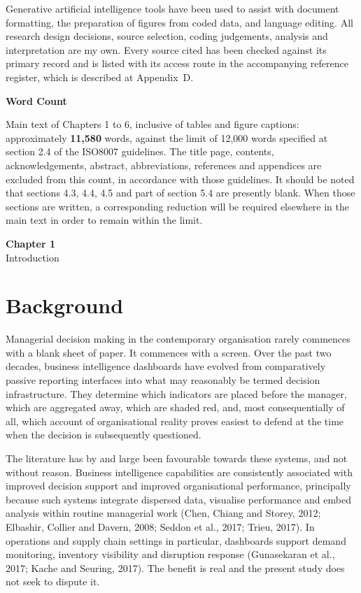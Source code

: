 \documentclass[12pt,a4paper]{article}
\newcounter{chapno}
\newcommand{\chapt}[2]{%
  \newpage
  \setcounter{chapno}{#1}%
  \setcounter{section}{0}\setcounter{subsection}{0}%
  \setcounter{figure}{0}\setcounter{table}{0}%
  \addtocontents{toc}{\protect\vspace{9pt}}%
  \addtocontents{toc}{\protect\noindent{\protect\bfseries Chapter #1:} #2\protect\par\protect\vspace{3pt}}%
  \begin{center}
    {\large\bfseries Chapter #1}\\[8pt]
    {\large #2}
  \end{center}
  \vspace{14pt}%
}
\begin{document}
Generative artificial intelligence tools have been used to assist with document formatting, the preparation
of figures from coded data, and language editing. All research design decisions, source selection, coding
judgements, analysis and interpretation are my own. Every source cited has been checked against its primary
record and is listed with its access route in the accompanying reference register, which is described at
Appendix~D.

\vspace{10pt}
\begin{center}{\large\bfseries Word Count}\end{center}
\vspace{10pt}

Main text of Chapters 1 to 6, inclusive of tables and figure captions: approximately \textbf{11,580}
words, against the limit of 12,000 words specified at section 2.4 of the ISO8007 guidelines. The title
page, contents, acknowledgements, abstract, abbreviations, references and appendices are excluded from this
count, in accordance with those guidelines. It should be noted that sections 4.3, 4.4, 4.5 and part of
section 5.4 are presently blank. When those sections are written, a corresponding reduction will be
required elsewhere in the main text in order to remain within the limit.

\newpage
{}
\setcounter{page}{1}

\chapt{1}{Introduction}

\section{Background}

Managerial decision making in the contemporary organisation rarely commences with a blank sheet of paper.
It commences with a screen. Over the past two decades, business intelligence dashboards have evolved from
comparatively passive reporting interfaces into what may reasonably be termed decision infrastructure. They
determine which indicators are placed before the manager, which are aggregated away, which are shaded red,
and, most consequentially of all, which account of organisational reality proves easiest to defend at the
time when the decision is subsequently questioned.

The literature has by and large been favourable towards these systems, and not without reason.
Business intelligence capabilities are consistently associated with improved decision support and
improved organisational performance, principally because such systems integrate dispersed data,
visualise performance and embed analysis within routine managerial work (Chen, Chiang and Storey,
2012; Elbashir, Collier and Davern, 2008; Seddon et al., 2017; Trieu, 2017). In operations and
supply chain settings in particular,
dashboards support demand monitoring, inventory visibility and disruption response (Gunasekaran et
al., 2017; Kache and Seuring, 2017). The benefit is real and the present study does not seek to
dispute it.
\end{document}
